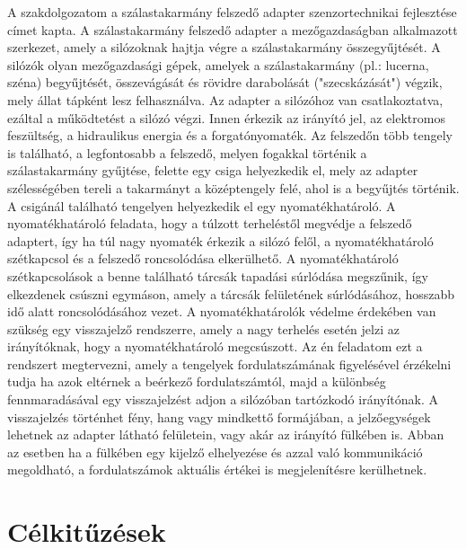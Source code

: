 A szakdolgozatom a szálastakarmány felszedő adapter szenzortechnikai fejlesztése címet kapta. A szálastakarmány felszedő adapter a mezőgazdaságban alkalmazott szerkezet, amely a silózoknak hajtja végre a szálastakarmány összegyűjtését. A silózók olyan mezőgazdasági gépek, amelyek a szálastakarmány (pl.: lucerna, széna) begyűjtését, összevágását és rövidre darabolását ("szecskázását") végzik, mely állat tápként lesz felhasználva. Az adapter a silózóhoz van csatlakoztatva, ezáltal a működtetést a silózó végzi. Innen érkezik az irányító jel, az elektromos feszültség, a hidraulikus energia és a forgatónyomaték. Az felszedőn több tengely is található, a legfontosabb a felszedő, melyen fogakkal történik a szálastakarmány gyűjtése, felette egy csiga helyezkedik el, mely az adapter szélességében tereli a takarmányt a középtengely felé, ahol is a begyűjtés történik. A csigánál található tengelyen helyezkedik el egy nyomatékhatároló. A nyomatékhatároló feladata, hogy a túlzott terheléstől megvédje a felszedő adaptert, így ha túl nagy nyomaték érkezik a silózó felől, a nyomatékhatároló szétkapcsol és a felszedő roncsolódása elkerülhető. A nyomatékhatároló szétkapcsolások a benne található tárcsák tapadási súrlódása megszűnik, így elkezdenek csúszni egymáson, amely a tárcsák felületének súrlódásához, hosszabb idő alatt roncsolódásához vezet. A nyomatékhatárolók védelme érdekében van szükség egy visszajelző rendszerre, amely a nagy terhelés esetén jelzi az irányítóknak, hogy a nyomatékhatároló megcsúszott.
Az én feladatom ezt a rendszert megtervezni, amely a tengelyek fordulatszámának figyelésével érzékelni tudja ha azok eltérnek a beérkező fordulatszámtól, majd a különbség fennmaradásával egy visszajelzést adjon a silózóban tartózkodó irányítónak. A visszajelzés történhet fény, hang vagy mindkettő formájában, a jelzőegységek lehetnek az adapter látható felületein, vagy akár az irányító fülkében is. Abban az esetben ha a fülkében egy kijelző elhelyezése és azzal való kommunikáció megoldható, a fordulatszámok aktuális értékei is megjelenítésre kerülhetnek.

\section{Célkitűzések}

